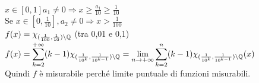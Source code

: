 \documentclass[12px]{article}
\begin{document}
     $\displaystyle x\in[0,1] a_1\neq 0 \Rightarrow x\geq \frac {a_1}{10}\geq \frac 1{10}$\\
     Se $x\in[0,\frac{1}{10}], a_2\neq 0 \Rightarrow  x > \frac {1}{100}$ \\
     $f(x) = \chi_{(\frac{1}{100},\frac{1}{10})\setminus \mathbb{Q}}$ (tra 0,01 e 0,1) \\
     $\displaystyle f(x) = \sum^{+\infty}_{k = 2}(k-1)\chi_{(\frac{1}{10^k}, \frac{1}{10^{k-1}})\setminus \mathbb{Q}} = \lim_{n  \rightarrow +\infty} \sum^{n}_{k = 2}(k-1)\chi_{(\frac{1}{10^k}, \frac{1}{10^{k-1}})\setminus \mathbb{Q}}(x)$ \\
     Quindi $f$ è misurabile perché limite puntuale di funzioni misurabili.
\end{document}
